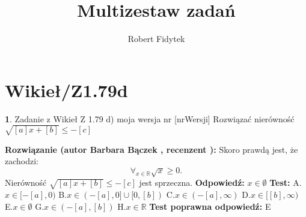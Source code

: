 \documentclass[12pt, a4paper]{article}
\title{Multizestaw zadań}
\author{Robert Fidytek}
\date{}
\theoremstyle{definition} %
\newtheorem{zad}{}
\newcommand{\kategoria}[1]{\section{#1}} %
\newcommand{\zadStart}[1]{\begin{zad}#1\newline} %
\newcommand{\zadStop}{\end{zad}}   %
\newcommand{\rozwStart}[2]{\noindent \textbf{Rozwiązanie (autor #1 , recenzent #2): }\newline} %
\newcommand{\rozwStop}{\newline}                                            %
\newcommand{\odpStart}{\noindent \textbf{Odpowiedź:}\newline}    %
\newcommand{\odpStop}{\newline}                                             %
\newcommand{\testStart}{\noindent \textbf{Test:}\newline} %
\newcommand{\testStop}{\newline} %
\newcommand{\kluczStart}{\noindent \textbf{Test poprawna odpowiedź:}\newline} %
\newcommand{\kluczStop}{\newline} %
\begin{document}
\maketitle


\kategoria{Wikieł/Z1.79d}
\zadStart{Zadanie z Wikieł Z 1.79 d) moja wersja nr [nrWersji]}
Rozwiązać nierówność $\sqrt{[a]x+[b]} \leq -[c]$
\zadStop
\rozwStart{Barbara Bączek}{}
Skoro prawdą jest, że zachodzi: $$\displaystyle\mathop{\forall}_{x \in \mathbb{R}} \sqrt{x} \geq 0.$$
Nierówność $\sqrt{[a]x+[b]} \leq -[c]$ jest sprzeczna.
\rozwStop
\odpStart
$x \in \emptyset$
\odpStop
\testStart
A.$x \in [-[a],0)$
B.$x \in (-[a],0] \cup [0, [b])$
C.$x \in (-[a], \infty)$
D.$x \in [[b], \infty)$
E.$x \in \emptyset$
G.$x \in (-[a],[b])$
H.$x \in \mathbb{R}$
\testStop
\kluczStart
E
\kluczStop
\end{document}
